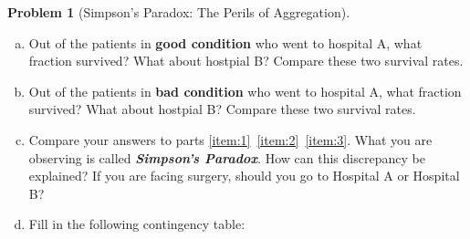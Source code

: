 \documentclass[10pt]{amsart}
\theoremstyle{definition}
\newtheorem{problem}[theorem]{Problem}
\newcommand{\1}[1]{\textbf{1}_{\left[#1\right]}} %
\newcommand{\dempfcolor}[1]{{\color{RoyalBlue}#1}}
\newcommand{\demph}[1]{\dempfcolor{\textbf{\textit{#1}}}}
\begin{document}
\begin{problem}[Simpson's Paradox: The Perils of Aggregation]
\begin{enumerate}[(a)]
    \begin{center}
      {\footnotesize
        \begin{tabular}{cc}
        \begin{tabular}{lcc}
          \multicolumn{3}{c}{\textbf{Good Condition}} \\ \hline
          \textbf{Outcome} & \textbf{Hospital A} & \textbf{Hospital B} \\ \hline
          Died     &    6    & 8       \\
          Survived & 594       & 592       \\ \hline
        \end{tabular}
        \quad \quad \quad \quad    &
                                     \begin{tabular}{lcc}
                                       \multicolumn{3}{c}{\textbf{Poor Condition}} \\ \hline
                                       \textbf{Outcome} & \textbf{Hospital A} & \textbf{Hospital B} \\ \hline
                                       Died     &  57      & 8       \\
                                       Survived & 1443       & 192       \\ \hline
                                     \end{tabular}
      \end{tabular}}
    \end{center}
    What fraction of Hospital A's patients were classified as good
    condition? What about Hospital B?
    \vspace{2cm}
    \item \label{item:2} Out of the patients in \textbf{good condition} who went to hospital A,
    what fraction survived? What about hostpial B? Compare these two survival
    rates.
    \vspace{2cm}
    \item \label{item:3} Out of the patients in \textbf{bad condition} who went to hospital A,
    what fraction survived? What about hostpial B? Compare these two survival
    rates.
    \newpage
    \item Compare your answers to parts
    \ref{item:1}~\ref{item:2}~\ref{item:3}. What you are observing is called
    \demph{Simpson's Paradox}. How can this discrepancy be
    explained? If you are facing surgery, should you go to Hospital A or
    Hospital B?
    \vspace{3cm}
    \item Fill in the following contingency table:

\end{enumerate}
\end{problem}
\end{document}
